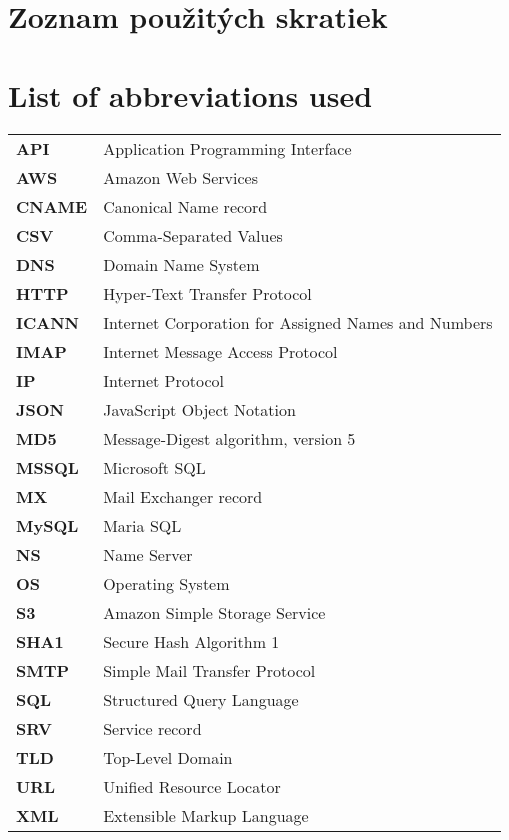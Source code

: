 \thispagestyle{plain}

\ifx\FIITlagEN\undefined
\section*{\Huge Zoznam použitých skratiek}
\else
\section*{\Huge List of abbreviations used}
\fi
\vskip 1cm

\begin{tabular}{ >{\bfseries}m{2cm} m{10cm} }
API		& Application Programming Interface \\
AWS		& Amazon Web Services \\
CNAME	& Canonical Name record \\
CSV		& Comma-Separated Values \\
DNS		& Domain Name System \\
HTTP	& Hyper-Text Transfer Protocol \\
ICANN	& Internet Corporation for Assigned Names and Numbers \\
IMAP	& Internet Message Access Protocol \\
IP		& Internet Protocol \\
JSON	& JavaScript Object Notation \\
MD5		& Message-Digest algorithm, version 5 \\
MSSQL	& Microsoft SQL \\
MX		& Mail Exchanger record \\
MySQL	& Maria SQL  \\
NS		& Name Server \\
OS		& Operating System \\
S3		& Amazon Simple Storage Service \\
SHA1	& Secure Hash Algorithm 1 \\
SMTP	& Simple Mail Transfer Protocol \\
SQL		& Structured Query Language \\
SRV		& Service record \\
TLD		& Top-Level Domain \\
URL		& Unified Resource Locator \\
XML		& Extensible Markup Language   
\end{tabular}

